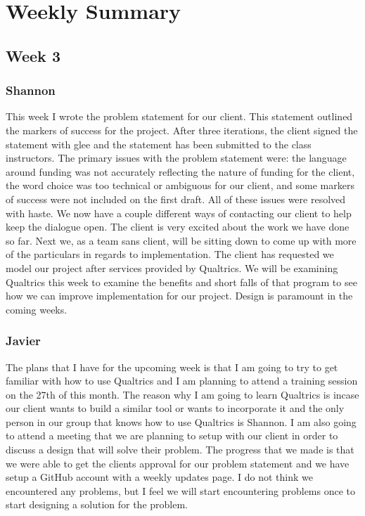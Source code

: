 \documentclass[letterpaper,10pt,serif, draftclsnofoot,onecolumn, compsoc, titlepage]{IEEEtran}
\begin{document}
\section{Weekly Summary}
\subsection{Week 3}
\subsubsection{Shannon}
This week I wrote the problem statement for our client. This statement outlined the markers of success for the project. After three iterations, the client signed the statement with glee and the statement has been submitted to the class instructors. The primary issues with the problem statement were: the language around funding was not accurately reflecting the nature of funding for the client, the word choice was too technical or ambiguous for our client, and some markers of success were not included on the first draft. All of these issues were resolved with haste. We now have a couple different ways of contacting our client to help keep the dialogue open. The client is very excited about the work we have done so far. Next we, as a team sans client, will be sitting down to come up with more of the particulars in regards to implementation. The client has requested we model our project after services provided by Qualtrics. We will be examining Qualtrics this week to examine the benefits and short falls of that program to see how we can improve implementation for our project. Design is paramount in the coming weeks.
\subsubsection{Javier}
The plans that I have for the upcoming week is that I am going to try to get familiar with how to use Qualtrics and I am planning to attend a training session on the 27th of this month. The reason why I am going to learn Qualtrics is incase our client wants to build a similar tool or wants to incorporate it and the only person in our group that knows how to use Qualtrics is Shannon. I am also going to attend a meeting that we are planning to setup with our client in order to discuss a design that will solve their problem. The progress that we made is that we were able to get the clients approval for our problem statement and we have setup a GitHub account with a weekly updates page. I do not think we encountered any problems, but I feel we will start encountering problems once to start designing a solution for the problem.
\end{document}
